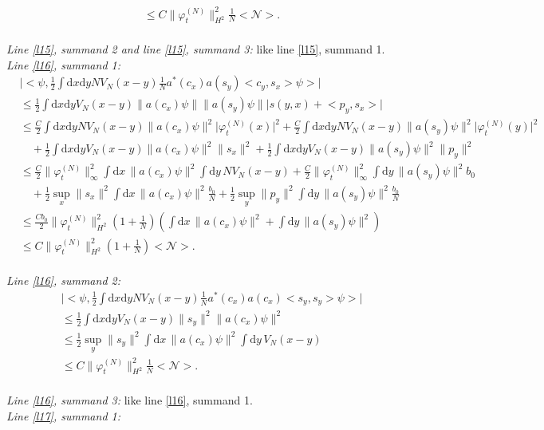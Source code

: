\documentclass[11pt,a4paper,draft,DIV11]{scrartcl}	%
\newcommand{\di}{\textrm{d}}		%
\newcommand{\Ncal}{\mathcal{N}}		%
\newcommand{\estlist}[2]{\emph{\vspace{.3em}\\Line \ref{l#1}, summand #2:}}
\newcommand{\nestlist}[2]{line \ref{l#1}, summand #2}
\newcommand{\Nestlist}[2]{Line \ref{l#1}, summand #2}
\newcommand{\scal}[2]{\big<#1,#2\big>} %
\newcommand{\norm}[1]{\lVert#1\rVert}	%
\newcommand{\ev}[1]{\big<#1\big>}	%
\newcommand{\ph}{\varphi_t^{(N)}}	%
\newcommand{\dxyNV}{\frac{1}{2}\int \di x\di y N V_N(x-y)} %
\newcommand{\dxyV}{\frac{1}{2}\int \di x\di y V_N(x-y)} %
\begin{document}
\begin{fleqn}[0.5em]
\begin{align*}
& \leq C \norm{\ph}_{H^2}^2 \frac{1}{N}\ev{\Ncal}. 
\end{align*}
\emph{\vspace{.3em}\\\Nestlist{15}{2} and \nestlist{15}{3}:} like \nestlist{15}{1}.\newline
\estlist{16}{1}
\begin{align*}
& \lvert \scal{\psi}{\dxyNV \frac{1}{N}a^\ast(c_x) a(s_y) \scal{c_y}{s_x}\psi} \rvert \\
& \leq \dxyV \norm{a(c_x)\psi} \norm{a(s_y)\psi} \lvert s(y,x)+\scal{p_y}{s_x} \rvert \\
& \leq \frac{C}{2}\int \di x\di y N V_N(x-y) \norm{a(c_x)\psi}^2 \lvert \ph(x)\rvert^2 + \frac{C}{2}\int \di x\di y N V_N(x-y) \norm{a(s_y)\psi}^2 \lvert \ph(y)\rvert^2\\
& \quad + \dxyV \norm{a(c_x)\psi}^2 \norm{s_x}^2 + \dxyV \norm{a(s_y)\psi}^2 \norm{p_y}^2 \\
& \leq \frac{C}{2} \norm{\ph}_\infty^2 \int \di x\, \norm{a(c_x)\psi}^2 \int \di y\, NV_N(x-y) + \frac{C}{2} \norm{\ph}_\infty^2 \int \di y\, \norm{a(s_y)\psi}^2 b_0 \\
& \quad + \frac{1}{2}\sup_x\norm{s_x}^2 \int \di x\, \norm{a(c_x)\psi}^2 \frac{b_0}{N} + \frac{1}{2} \sup_y \norm{p_y}^2 \int \di y\, \norm{a(s_y)\psi}^2 \frac{b_0}{N} \\
& \leq \frac{C b_0}{2} \norm{\ph}_{H^2}^2 \left(1+\frac{1}{N}\right) \left( \int \di x\,\norm{a(c_x)\psi}^2 + \int \di y\,\norm{a(s_y)\psi}^2 \right) \\
& \leq C\norm{\ph}_{H^2}^2 \left(1+\frac{1}{N}\right)\ev{\Ncal}.
\end{align*}
\estlist{16}{2}
\begin{align*}
& \lvert \scal{\psi}{\dxyNV \frac{1}{N} a^\ast(c_x) a(c_x)\scal{s_y}{s_y}\psi} \rvert \\
& \leq \dxyV \norm{s_y}^2 \norm{a(c_x)\psi}^2 \\
& \leq \frac{1}{2} \sup_y \norm{s_y}^2 \int \di x\, \norm{a(c_x)\psi}^2 \int \di y\, V_N(x-y) \\
& \leq C\norm{\ph}_{H^2}^2 \frac{1}{N}\ev{\Ncal}.
\end{align*}
\emph{\vspace{.3em}\\\Nestlist{16}{3}:} like \nestlist{16}{1}.\newline
\estlist{17}{1}
\begin{align*}

\end{align*}
\end{fleqn}
\end{document}
